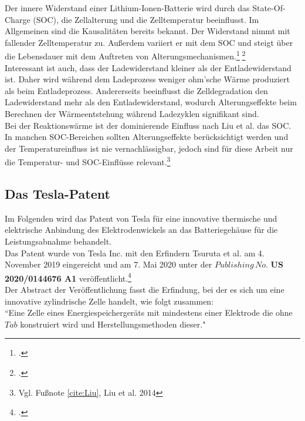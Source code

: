 Der innere Widerstand einer Lithium-Ionen-Batterie wird durch das State-Of-Charge (SOC), die Zellalterung und die Zelltemperatur beeinflusst. Im Allgemeinen sind die Kausalitäten bereits bekannt. Der Widerstand nimmt mit fallender Zelltemperatur zu. Außerdem variiert er mit dem SOC und steigt über die Lebensdauer mit dem Auftreten von Alterungsmechanismen.\footcite[Vgl.][]{Andre.2011}$\;$\footcite[Vgl.][]{Ecker.2012}\\
Interessant ist auch, dass der Ladewiderstand kleiner als der Entladewiderstand ist. Daher wird während dem Ladeprozess weniger ohm'sche Wärme produziert als beim Entladeprozess. Andererseits beeinflusst die Zelldegradation den Ladewiderstand mehr als den Entladewiderstand, wodurch Alterungseffekte beim Berechnen der Wärmeentstehung während Ladezyklen signifikant sind.\\
Bei der Reaktionswärme ist der dominierende Einfluss nach Liu et al. das SOC. In manchen SOC-Bereichen sollten Alterungseffekte berücksichtigt werden und der Temperatureinfluss ist nie vernachlässigbar, jedoch sind für diese Arbeit nur die Temperatur- und SOC-Einflüsse relevant.\footnote{Vgl. Fußnote \ref{cite:Liu}, Liu et al. 2014}

\newpage
\subsection{Das Tesla-Patent}

Im Folgenden wird das Patent von Tesla für eine innovative thermische und elektrische Anbindung des Elektrodenwickels an das Batteriegehäuse für die Leistungsabnahme behandelt.\\
Das Patent wurde von Tesla Inc. mit den Erfindern Tsuruta et al. am 4. November 2019 eingereicht und am 7. Mai 2020 unter der $Publishing\,No.$ \textbf{US 2020/0144676 A1} veröffentlicht.\footcite[Vgl.\label{cite:TeslaPatent}][]{TsurutaTesla2020}\\
Der Abstract der Veröffentlichung fasst die Erfindung, bei der es sich um eine innovative zylindrische Zelle handelt, wie folgt zusammen: \\
``Eine Zelle eines Energiespeichergeräts mit mindestens einer Elektrode die ohne $Tab$ konstruiert wird und Herstellungsmethoden dieser."\\

